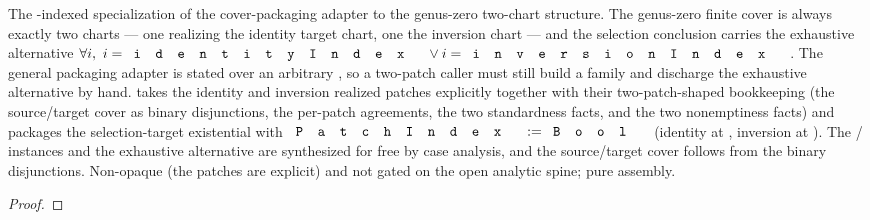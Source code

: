 \begin{lemma}
\label{lem:montel-realized-patch-cover-twochart}
The -indexed specialization of the cover-packaging adapter to the
genus-zero two-chart structure. The genus-zero finite cover is always exactly two
charts --- one realizing the identity target chart, one the inversion chart --- and
the selection conclusion carries the exhaustive alternative
\(\forall i,\ i=\code{identityIndex}\lor i=\code{inversionIndex}\). The general
packaging adapter is stated over an arbitrary , so a two-patch
caller must still build a  family and discharge the exhaustive
alternative by hand.  takes the
identity and inversion realized patches explicitly together with their
two-patch-shaped bookkeeping (the source/target cover as binary disjunctions, the
per-patch  agreements, the two standardness facts, and the two
 nonemptiness facts) and packages the
selection-target existential with \(\code{PatchIndex}:=\code{Bool}\) (identity at
, inversion at ). The /
instances and the exhaustive alternative are synthesized for free by
 case analysis, and the source/target cover follows from the binary
disjunctions. Non-opaque (the patches are explicit) and not gated on the open
analytic spine; pure assembly.
\leanok
\end{lemma}
\begin{proof}\leanok\end{proof}

